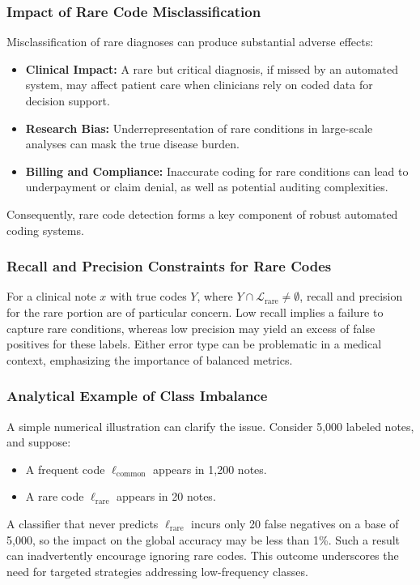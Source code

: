\subsubsection{Impact of Rare Code Misclassification}
Misclassification of rare diagnoses can produce substantial adverse effects:

\begin{itemize}
    \item \textbf{Clinical Impact:} A rare but critical diagnosis, if missed by an automated system, may affect patient care when clinicians rely on coded data for decision support.
    \item \textbf{Research Bias:} Underrepresentation of rare conditions in large-scale analyses can mask the true disease burden.
    \item \textbf{Billing and Compliance:} Inaccurate coding for rare conditions can lead to underpayment or claim denial, as well as potential auditing complexities.
\end{itemize}

Consequently, rare code detection forms a key component of robust automated coding systems.

\subsubsection{Recall and Precision Constraints for Rare Codes}
For a clinical note \(x\) with true codes \(Y\), where \(Y \cap \mathcal{L}_{\text{rare}} \neq \emptyset\), recall and precision for the rare portion are of particular concern. Low recall implies a failure to capture rare conditions, whereas low precision may yield an excess of false positives for these labels. Either error type can be problematic in a medical context, emphasizing the importance of balanced metrics.

\subsubsection{Analytical Example of Class Imbalance}
A simple numerical illustration can clarify the issue. Consider 5,000 labeled notes, and suppose:
\begin{itemize}
    \item A frequent code \(\ell_{\mathrm{common}}\) appears in 1,200 notes.
    \item A rare code \(\ell_{\mathrm{rare}}\) appears in 20 notes.
\end{itemize}
A classifier that never predicts \(\ell_{\mathrm{rare}}\) incurs only 20 false negatives on a base of 5,000, so the impact on the global accuracy may be less than 1\%. Such a result can inadvertently encourage ignoring rare codes. This outcome underscores the need for targeted strategies addressing low-frequency classes.


